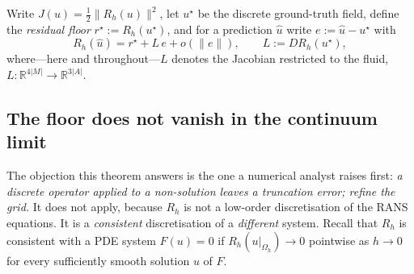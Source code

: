 Write $J(u)=\tfrac12\|R_h(u)\|^2$, let $u^\star$ be the discrete ground-truth field, define
the \emph{residual floor} $r^\star:=R_h(u^\star)$, and for a prediction $\hat u$ write
$e:=\hat u-u^\star$ with
\begin{equation}
R_h(\hat u)=r^\star+L\,e+o(\|e\|),\qquad L:=DR_h(u^\star),
\label{eq:rf-decomp}
\end{equation}
where---here and throughout---$L$ denotes the Jacobian restricted to the fluid,
$L:\mathbb{R}^{4|M|}\to\mathbb{R}^{3|A|}$.

\subsection{The floor does not vanish in the continuum limit}

The objection this theorem answers is the one a numerical analyst raises first: \emph{a
discrete operator applied to a non-solution leaves a truncation error; refine the grid.}
It does not apply, because $R_h$ is not a low-order discretisation of the RANS equations.
It is a \emph{consistent} discretisation of a \emph{different} system. Recall that $R_h$ is
consistent with a PDE system $F(u)=0$ if $R_h(u|_{\Omega_h})\to0$ pointwise as $h\to0$ for
every sufficiently smooth solution $u$ of $F$.

